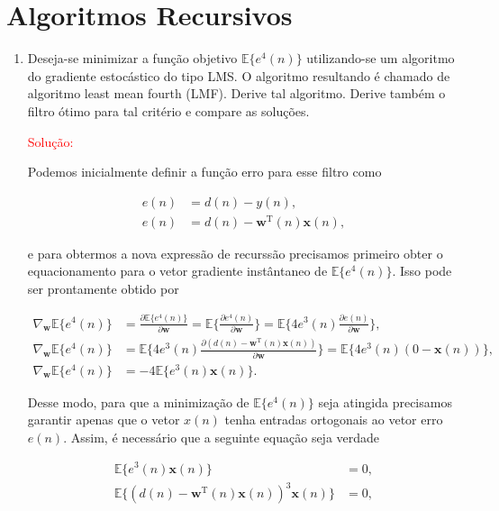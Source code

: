 \documentclass[a4paper,10pt]{article}
\begin{document}
	\newpage
	\section*{Algoritmos Recursivos}
	
		\begin{enumerate}
			
			\item Deseja-se minimizar a função objetivo $\mathbb{E}\{e^{4}(n)\}$ utilizando-se um algoritmo do gradiente estocástico do tipo LMS. O algoritmo resultando é chamado de algoritmo least mean fourth (LMF). Derive tal algoritmo. Derive também o ﬁltro ótimo para tal critério e compare as soluções.
			
				\textcolor{red}{Solução:}
				
				Podemos inicialmente definir a função erro para esse filtro como
				
				\begin{align}
					e(n) &= d(n) - y(n), \\
					e(n) &= d(n) - \mathbf{w}^{\text{T}}(n)\mathbf{x}(n),
				\end{align}
				
				e para obtermos a nova expressão de recurssão precisamos primeiro obter o equacionamento para o vetor gradiente instântaneo de $\mathbb{E}\{e^{4}(n)\}$. Isso pode ser prontamente obtido por

				\begin{align}
					\nabla_{\mathbf{w}} \mathbb{E}\{e^{4}(n)\} &= \frac{\partial \mathbb{E}\{e^{4}(n)\}}{\partial \mathbf{w}} = \mathbb{E}\{ \frac{\partial e^{4}(n)}{\partial \mathbf{w}}\} = \mathbb{E}\{4 e^{3}(n) \frac{\partial e(n) }{\partial \mathbf{w}}\}, \\
					\nabla_{\mathbf{w}} \mathbb{E}\{e^{4}(n)\} &= \mathbb{E}\{4 e^{3}(n) \frac{\partial (d(n) - \mathbf{w}^{\text{T}}(n)\mathbf{x}(n)) }{\partial \mathbf{w}}\} = \mathbb{E}\{4 e^{3}(n) (0 - \mathbf{x}(n))\}, \\
					\nabla_{\mathbf{w}} \mathbb{E}\{e^{4}(n)\} &= - 4 \mathbb{E}\{e^{3}(n) \mathbf{x}(n)\}.
				\end{align}
			
				Desse modo, para que a minimização de $\mathbb{E}\{e^{4}(n)\}$ seja atingida precisamos garantir apenas que o vetor $x(n)$ tenha entradas ortogonais ao vetor erro $e(n)$. Assim, é necessário que a seguinte equação seja verdade

				\begin{align}
					\mathbb{E}\{e^{3}(n) \mathbf{x}(n)\} &= 0, \\
					\mathbb{E}\{(d(n) - \mathbf{w}^{\text{T}}(n)\mathbf{x}(n))^{3} \mathbf{x}(n)\} &= 0, 
				\end{align}


\end{enumerate}
\end{document}
